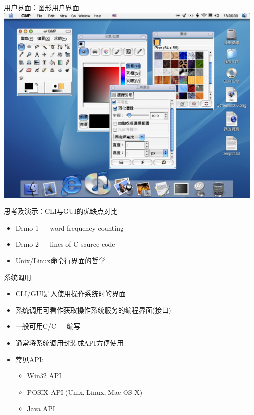 \documentclass[xcolor=svgnames]{beamer}
\begin{document}
\begin{CJK*}{UTF8}{gbsn}
\begin{frame}{用户界面：图形用户界面}
\includegraphics[width=1.0\textwidth]{macos.jpg}
\end{frame}

\begin{frame}{思考及演示：CLI与GUI的优缺点对比}
\begin{itemize}
\item Demo 1 --- word frequency counting
\item Demo 2 --- lines of C source code 
\item Unix/Linux命令行界面的哲学
\end{itemize}
\end{frame}

\begin{frame}{系统调用}
\begin{itemize}
\item CLI/GUI是人使用操作系统时的界面
\item 系统调用可看作获取操作系统服务的编程界面(接口)
\item 一般可用C/C++编写
\item 通常将系统调用封装成API方便使用
\item 常见API:
\begin{itemize}
\item Win32 API
\item POSIX API (Unix, Linux, Mac OS X)
\item Java API
\end{itemize}
\end{itemize}
\end{frame}


\end{CJK*}
\end{document}
